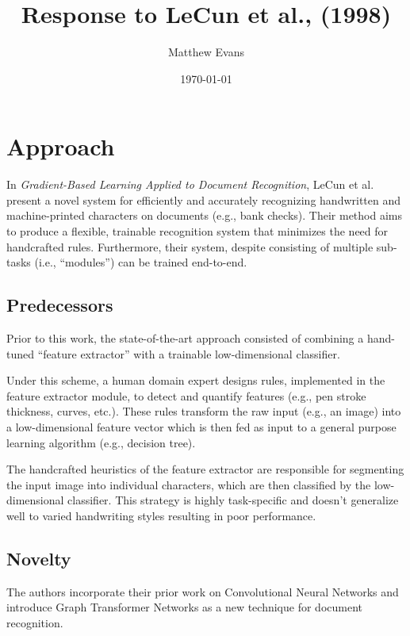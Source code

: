 \documentclass[10pt]{article}
\title{
    Response to LeCun et al., (1998) \\
}
\author{Matthew Evans}
\date{\today}
\begin{document}
\maketitle

\section*{Approach}
In \textit{Gradient-Based Learning Applied to Document Recognition}\cite{lecun1998gradient}, LeCun et al. present a novel system for efficiently and accurately recognizing handwritten and machine-printed characters on documents (e.g., bank checks). Their method aims to produce a flexible, trainable recognition system that minimizes the need for handcrafted rules. Furthermore, their system, despite consisting of multiple sub-tasks (i.e., ``modules'') can be trained end-to-end.


\subsection*{Predecessors}


Prior to this work, the state-of-the-art approach consisted of combining a hand-tuned ``feature extractor'' with a trainable low-dimensional classifier.

Under this scheme, a human domain expert designs rules, implemented in the feature extractor module, to detect and quantify features (e.g., pen stroke thickness, curves, etc.). These rules transform the raw input (e.g., an image) into a low-dimensional feature vector which is then fed as input to a general purpose learning algorithm (e.g., decision tree).

The handcrafted heuristics of the feature extractor are responsible for segmenting the input image into individual characters, which are then classified by the low-dimensional classifier. This strategy is highly task-specific and doesn't generalize well to varied handwriting styles resulting in poor performance.


\subsection*{Novelty}
The authors incorporate their prior work on Convolutional Neural Networks\cite{10.1162/neco.1989.1.4.541} and introduce Graph Transformer Networks as a new technique for document recognition.
\end{document}
